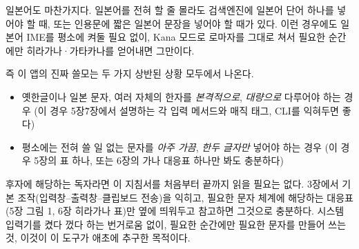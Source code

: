\documentclass{simplman}
\begin{document}
일본어도 마찬가지다. 일본어를 전혀 할 줄 몰라도 검색엔진에 일본어 단어 하나를 넣어야 할 때, 또는 인용문에 짧은 일본어 문장을 넣어야 할 때가 있다. 이런 경우에도 일본어 IME를 평소에 켜둘 필요 없이, Kana 모드로 로마자를 그대로 쳐서 필요한 순간에만 히라가나·가타카나를 얻어내면 그만이다.

즉 이 앱의 진짜 쓸모는 두 가지 상반된 상황 모두에서 나온다.
\begin{itemize}\oblivoirlist
\item 옛한글이나 일본 문자, 여러 자체의 한자를 \emph{본격적으로}, \emph{대량으로} 다루어야 하는 경우 (이 경우 5장\~7장에서 설명하는 각 입력 메서드와 매직 태그, CLI를 익혀두면 좋다)
\item 평소에는 전혀 쓸 일 없는 문자를 \emph{아주 가끔}, \emph{한두 글자만} 넣어야 하는 경우 (이 경우 5장의 표 하나, 또는 6장의 가나 대응표 하나만 봐도 충분하다)
\end{itemize}

후자에 해당하는 독자라면 이 지침서를 처음부터 끝까지 읽을 필요는 없다. 3장에서 기본 조작(입력창--출력창--클립보드 전송)을 익히고, 필요한 문자 체계에 해당하는 대응표(5장 그림 1, 6장 히라가나 표)만 옆에 띄워두고 참고하면 그것으로 충분하다. 시스템 입력기를 켰다 껐다 하는 번거로움 없이, 필요한 순간에만 필요한 문자를 만들어 쓰는 것, 이것이 이 도구가 애초에 추구한 목적이다.
\end{document}
